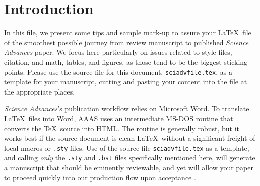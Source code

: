 \documentclass[12pt]{article}
\begin{document}
\section*{Introduction}


In this file, we present some tips and sample mark-up to assure your
\LaTeX\ file of the smoothest possible journey from review manuscript
to published {\it Science Advances\/} paper.  We focus here particularly on
issues related to style files, citation, and math, tables, and
figures, as those tend to be the biggest sticking points.  Please use
the source file for this document, \texttt{sciadvfile.tex}, as a template
for your manuscript, cutting and pasting your content into the file at
the appropriate places.

{\it Science Advances\/}'s publication workflow relies on Microsoft Word.  To
translate \LaTeX\ files into Word, AAAS uses an intermediate MS-DOS
routine \cite{tth} that converts the \TeX\ source into HTML\@.  The
routine is generally robust, but it works best if the source document
is clean \LaTeX\ without a significant freight of local macros or
\texttt{.sty} files.  Use of the source file \texttt{sciadvfile.tex} as a
template, and calling {\it only\/} the \texttt{.sty} and \texttt{.bst}
files specifically mentioned here, will generate a manuscript that
should be eminently reviewable, and yet will allow your paper to
proceed quickly into our production flow upon acceptance \cite{use2e}.
\end{document}
